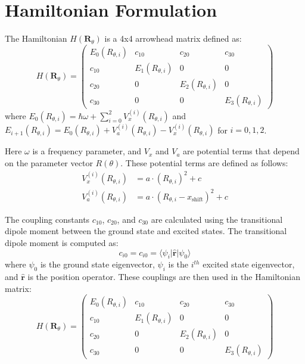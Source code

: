 \documentclass{article}
\begin{document}
\section{Hamiltonian Formulation}
The Hamiltonian $H(\bm{R}_{\theta})$ is a 4x4 arrowhead matrix defined as:
\begin{equation}
H(\bm{R}_{\theta}) = \begin{pmatrix}
E_0(R_{\theta,i}) & c_{10} & c_{20} & c_{30} \\
c_{10} & E_1(R_{\theta,i}) & 0 & 0 \\
c_{20} & 0 & E_2(R_{\theta,i}) & 0 \\
c_{30} & 0 & 0 & E_3(R_{\theta,i})
\end{pmatrix}
\end{equation}
where $E_0(R_{\theta,i}) = \hbar\omega + \sum_{i=0}^2 V_x^{(i)}(R_{\theta,i})$ and $E_{i+1}(R_{\theta,i}) = E_0(R_{\theta,i}) + V_a^{(i)}(R_{\theta,i}) - V_x^{(i)}(R_{\theta,i})$ for $i=0,1,2$.

Here $\omega$ is a frequency parameter, and $V_x$ and $V_a$ are potential terms that depend on the parameter vector $R(\theta)$. These potential terms are defined as follows:
\begin{align}
V_x^{(i)}(R_{\theta,i}) &= a \cdot (R_{\theta,i})^2 + c \\
V_a^{(i)}(R_{\theta,i}) &= a \cdot (R_{\theta,i} - x_{\text{shift}})^2 + c
\end{align}

The coupling constants $c_{10}$, $c_{20}$, and $c_{30}$ are calculated using the transitional dipole moment between the ground state and excited states. The transitional dipole moment is computed as:
\begin{equation}
c_{i0} = c_{i0} = \langle \psi_i | \hat{\bm{r}} | \psi_0 \rangle
\end{equation}
where $\psi_0$ is the ground state eigenvector, $\psi_i$ is the $i^{th}$ excited state eigenvector, and $\hat{\bm{r}}$ is the position operator. These couplings are then used in the Hamiltonian matrix:
\begin{equation}
H(\bm{R}_{\theta}) = \begin{pmatrix}
E_0(R_{\theta,i}) & c_{10} & c_{20} & c_{30} \\
c_{10} & E_1(R_{\theta,i}) & 0 & 0 \\
c_{20} & 0 & E_2(R_{\theta,i}) & 0 \\
c_{30} & 0 & 0 & E_3(R_{\theta,i})
\end{pmatrix}
\end{equation}
\end{document}
